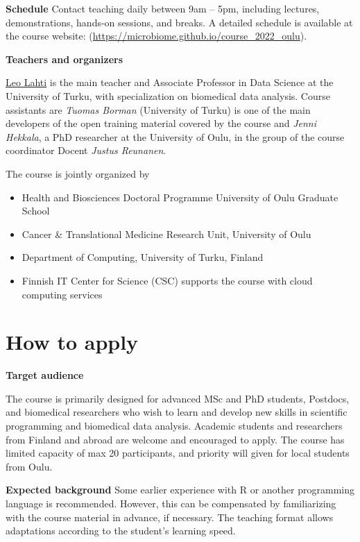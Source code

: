 \documentclass[
  oneside]{book}
\providecommand{\tightlist}{%
  \setlength{\itemsep}{0pt}\setlength{\parskip}{0pt}}
\begin{document}
\textbf{Schedule} Contact teaching daily between 9am -- 5pm, including
lectures, demonstrations, hands-on sessions, and breaks. A
detailed schedule is available at the course website:
(\url{https://microbiome.github.io/course_2022_oulu}).

\textbf{Teachers and organizers}

\href{https://datascience.utu.fi}{Leo Lahti} is the main teacher and Associate Professor in Data Science at the University of Turku, with specialization on biomedical data analysis. Course assistants are \emph{Tuomas Borman} (University of Turku) is one of the main developers of the open training material covered by the course and \emph{Jenni Hekkala}, a PhD researcher at the University of Oulu, in the group of the course coordinator Docent \emph{Justus Reunanen}.

The course is jointly organized by

\begin{itemize}
\tightlist
\item
  Health and Biosciences Doctoral Programme University of Oulu Graduate School
\item
  Cancer \& Translational Medicine Research Unit, University of Oulu
\item
  Department of Computing, University of Turku, Finland
\item
  Finnish IT Center for Science (CSC) supports the course with cloud
  computing services
\end{itemize}

\hypertarget{how-to-apply}{%
\section{How to apply}\label{how-to-apply}}

\textbf{Target audience}

The course is primarily designed for advanced MSc and PhD students,
Postdocs, and biomedical researchers who wish to learn and develop new skills in
scientific programming and biomedical data analysis. Academic students
and researchers from Finland and abroad are welcome and encouraged to
apply. The course has limited capacity of max 20 participants, and
priority will given for local students from Oulu.

\textbf{Expected background} Some earlier experience with R or another
programming language is recommended. However, this can be
compensated by familiarizing with the course material in advance, if
necessary. The teaching format allows adaptations according to the
student's learning speed.
\end{document}
